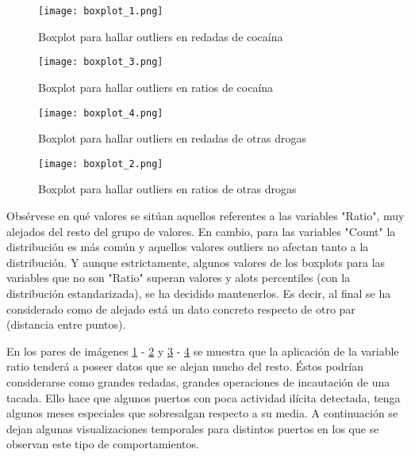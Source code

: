 \documentclass[12pt]{article}
\begin{document}
		\begin{figure}[H]
			\caption{\label{boxplot_1} Boxplot para hallar outliers en redadas de cocaína}
			\centering
			\hspace*{1cm}
			\texttt{[image: boxplot\_1.png]}
		\end{figure}
	
		\begin{figure}[H]
			\caption{\label{boxplot_3} Boxplot para hallar outliers en ratios de cocaína}
			\centering
			\hspace*{1cm}
			\texttt{[image: boxplot\_3.png]}
		\end{figure}
	
		\begin{figure}[H]
			\caption{\label{boxplot_4} Boxplot para hallar outliers en redadas de otras drogas}
			\centering
			\hspace*{1cm}
			\texttt{[image: boxplot\_4.png]}
		\end{figure}
	
		\begin{figure}[H]
			\caption{\label{boxplot_2} Boxplot para hallar outliers en ratios de otras drogas}
			\centering
			\hspace*{1cm}
			\texttt{[image: boxplot\_2.png]}
		\end{figure}
		\newpage
	
		Obsérvese en qué valores se sitúan aquellos referentes a las variables "Ratio", muy alejados del resto del grupo de valores. En cambio, para las variables "Count" la distribución es más común y aquellos valores outliers no afectan tanto a la distribución. Y aunque estrictamente, algunos valores de los boxplots para las variables que no son "Ratio" superan valores y alots percentiles (con la distribución estandarizada), se ha decidido mantenerlos. Es decir, al final se ha considerado como de alejado está un dato concreto respecto de otro par (distancia entre puntos).
	
		En los pares de imágenes \ref{boxplot_1} - \ref{boxplot_3}  y \ref{boxplot_4} - \ref{boxplot_2} se muestra que la aplicación de la variable ratio tenderá a poseer datos que se alejan mucho del resto. Éstos podrían considerarse como grandes redadas, grandes operaciones de incautación de una tacada. Ello hace que algunos puertos con poca actividad ilícita detectada, tenga algunos meses especiales que sobresalgan respecto a su media. A continuación se dejan algunas visualizaciones temporales para distintos puertos en los que se observan este tipo de comportamientos.
	
\end{document}
